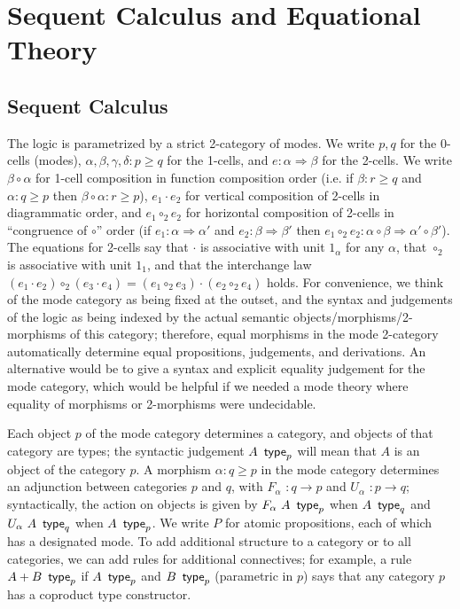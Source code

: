 \documentclass{drl-common/llncs}
\newcommand{\tc}[2]{\ensuremath{#1 \Rightarrow #2}}
\newcommand\compo[2]{\ensuremath{#1 \circ #2}}
\newcommand\compv[2]{\ensuremath{#1 \cdot #2}}
\newcommand\comph[2]{\ensuremath{#1 \mathbin{\circ_2} #2}}
\renewcommand\wftp[2]{\ensuremath{#1 \,\,\, \dsd{type}_{#2}}}
\newcommand\F[2]{\ensuremath{F_{#1} \,\, #2}}
\newcommand\U[2]{\ensuremath{U_{#1} \,\, #2}}
\newcommand\coprd[2]{\ensuremath{#1 + #2}}
\begin{document}
\section{Sequent Calculus and Equational Theory}
\label{sec:rules}

\subsection{Sequent Calculus}

The logic is parametrized by a strict 2-category of modes.  We write
$p,q$ for the 0-cells (modes), $\alpha,\beta,\gamma,\delta : p \ge q$
for the 1-cells, and $e : \tc \alpha \beta$ for the 2-cells.  We write
\compo{\beta}{\alpha} for 1-cell composition in function composition
order (i.e. if $\beta : r \ge q$ and $\alpha : q \ge p$ then
$\compo{\beta}{\alpha} : r \ge p$), \compv{e_1}{e_2} for vertical
composition of 2-cells in diagrammatic order, and \comph{e_1}{e_2} for
horizontal composition of 2-cells in ``congruence of \compo{}{}'' order
(if $e_1 : \tc \alpha {\alpha'}$ and $e_2 : \tc \beta \beta'$ then
$\comph{e_1}{e_2} :
\tc{\compo{\alpha}{\beta}}{\compo{\alpha'}{\beta'}}$).  The equations
for 2-cells say that \compv{}{} is associative with unit $1_\alpha$ for
any $\alpha$, that \comph{}{} is associative with unit $1_1$, and that
the interchange law $\comph{(\compv{e_1}{e_2})}{(\compv{e_3}{e_4})} =
\compv{(\comph{e_1}{e_3})}{(\comph{e_2}{e_4})}$ holds.  For convenience,
we think of the mode category as being fixed at the outset, and the
syntax and judgements of the logic as being indexed by the actual
semantic objects/morphisms/2-morphisms of this category; therefore,
equal morphisms in the mode 2-category automatically determine equal
propositions, judgements, and derivations.  An alternative would be to
give a syntax and explicit equality judgement for the mode category,
which would be helpful if we needed a mode theory where equality of
morphisms or 2-morphisms were undecidable.

Each object $p$ of the mode category determines a category, and objects
of that category are types; the syntactic judgement \wftp{A}{p} will
mean that $A$ is an object of the category $p$.  A morphism $\alpha : q
\ge p$ in the mode category determines an adjunction between categories
$p$ and $q$, with $\F \alpha {} : q \to p$ and $\U \alpha {} : p \to q$;
syntactically, the action on objects is given by $\wftp{\F \alpha A}{p}$
when $\wftp{A}{q}$ and $\wftp{\U \alpha A}{q}$ when $\wftp{A}{p}$.  We
write $P$ for atomic propositions, each of which has a designated mode.
To add additional structure to a category or to all categories, we can
add rules for additional connectives; for example, a rule
\wftp{\coprd{A}{B}}{p} if \wftp{A}{p} and \wftp{B}{p} (parametric in
$p$) says that any category $p$ has a coproduct type constructor.
\end{document}
